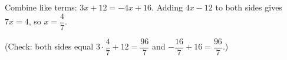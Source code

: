Combine like terms: $3x+12=-4x+16$. Adding $4x-12$ to both sides gives $7x=4$, so $x=\boxed{\dfrac47}$.

(Check: both sides equal $3\cdot\dfrac47+12=\dfrac{96}{7}$ and $-\dfrac{16}{7}+16=\dfrac{96}{7}$.)
